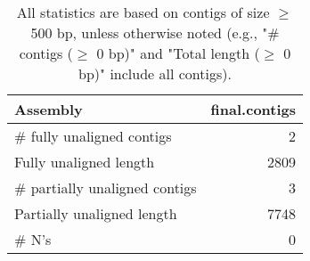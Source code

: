 \documentclass[12pt,a4paper]{article}
\begin{document}
\begin{table}[ht]
\begin{center}
\caption{All statistics are based on contigs of size $\geq$ 500 bp, unless otherwise noted (e.g., "\# contigs ($\geq$ 0 bp)" and "Total length ($\geq$ 0 bp)" include all contigs).}
\begin{tabular}{|l*{1}{|r}|}
\hline
Assembly & final.contigs \\ \hline
\# fully unaligned contigs & 2 \\ \hline
Fully unaligned length & 2809 \\ \hline
\# partially unaligned contigs & 3 \\ \hline
Partially unaligned length & 7748 \\ \hline
\# N's & 0 \\ \hline
\end{tabular}
\end{center}
\end{table}
\end{document}
